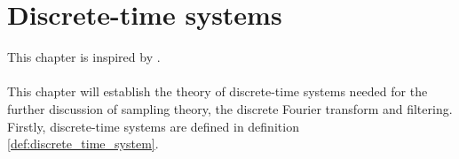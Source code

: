 \chapter{Discrete-time systems}\label{discrete_time_systems} \label{ch4}
This chapter is inspired by \cite{FSP}.\\\\
This chapter will establish the theory of discrete-time systems needed for the further discussion of sampling theory, the discrete Fourier transform and filtering. Firstly, discrete-time systems are defined in definition \ref{def:discrete_time_system}.


